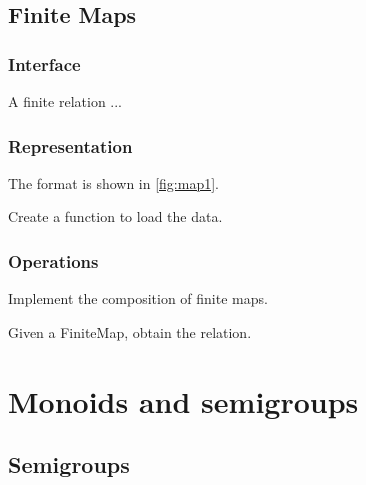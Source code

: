 \section{Finite Maps}

\subsection*{Interface}

A finite relation  ...


\subsection*{Representation}

The format is shown in \cref{fig:map1}.


\begin{exercise}[Representation]
  Create a function to load the data.


%

\end{exercise}

\subsection{Operations}


\begin{exercise}[Composition]
  Implement the composition of finite maps.


%

\end{exercise}


\begin{exercise}
  Given a FiniteMap, obtain the relation.


%

\end{exercise}


\chapter{Monoids and semigroups}


\section{Semigroups}

